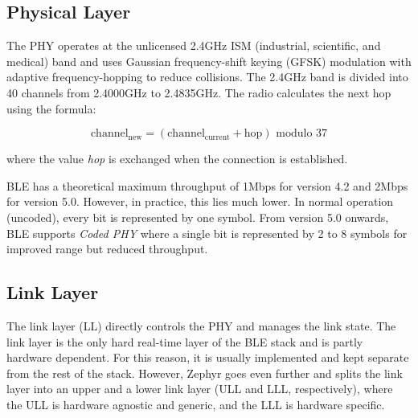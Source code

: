 \subsection{Physical Layer}
\label{sec:phy_layer}
The PHY operates at the unlicensed 2.4GHz ISM (industrial, scientific, and medical) band and uses Gaussian frequency-shift keying (GFSK) modulation with adaptive frequency-hopping to reduce collisions. The 2.4GHz band is divided into 40 channels from 2.4000GHz to 2.4835GHz. The radio calculates the next hop using the formula:

\[\text{channel}_{\text{new}} = (\text{channel}_{\text{current}} + \text{hop}) \text{ modulo } 37\]
    
where the value \textit{hop} is exchanged when the connection is established.

BLE has a theoretical maximum throughput of 1Mbps for version 4.2 and 2Mbps for version 5.0. However, in practice, this lies much lower. In normal operation (uncoded), every bit is represented by one symbol. From version 5.0 onwards, BLE supports \textit{Coded PHY} where a single bit is represented by 2 to 8 symbols for improved range but reduced throughput.

\subsection{Link Layer} 
The link layer (LL) directly controls the PHY and manages the link state. The link layer is the only hard real-time layer of the BLE stack and is partly hardware dependent. For this reason, it is usually implemented and kept separate from the rest of the stack. However, Zephyr goes even further and splits the link layer into an upper and a lower link layer (ULL and LLL, respectively), where the ULL is hardware agnostic and generic, and the LLL is hardware specific.

